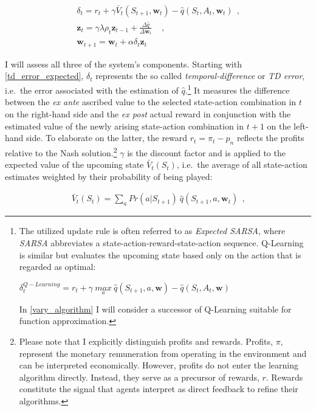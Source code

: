 \begin{gather}
\delta_t = r_t + \gamma \bar{V}_t(S_{t+1}, \boldsymbol{w}_t) - \hat{q}(S_t, A_t, \boldsymbol{w}_t) ~~ \text{,} \label{td_error_expected} \\
\boldsymbol{z}_{t} = 
\gamma \lambda \rho_t \boldsymbol{z}_{t-1} + \frac{\Delta \hat{q}}{\Delta \boldsymbol{w}_t} ~~~~~ \text{,} \label{eligibility_trace_update} \\
\boldsymbol{w}_{t+1} = \boldsymbol{w}_t + \alpha \delta_t	\boldsymbol{z}_t \label{update_rule}
\end{gather}

I will assess all three of the system's components. Starting with \autoref{td_error_expected}, $\delta_t$ represents the so called \emph{temporal-difference} or \emph{TD error}, i.e.\ the error associated with the estimation of $\hat{q}$.\footnote{The utilized update rule is often referred to as \emph{Expected SARSA}, where \emph{SARSA} abbreviates a state-action-reward-state-action sequence. Q-Learning is similar but evaluates the upcoming state based only on the action that is regarded as optimal:
	\begin{center}
		$\delta_t^{Q-Learning} = r_t + \gamma ~ \underset{a}{max} ~ \hat{q}(S_{t+1}, a, \boldsymbol{w}) - \hat{q}(S_t, A_t, \boldsymbol{w})$
	\end{center}
	In \autoref{vary_algorithm} I will consider a successor of Q-Learning suitable for function approximation.} It measures the difference between the \emph{ex ante} ascribed value to the selected state-action combination in $t$ on the right-hand side and the \emph{ex post} actual reward in conjunction with the estimated value of the newly arising state-action combination in $t+1$ on the left-hand side. To elaborate on the latter, the reward $r_t = \pi_t - p_n$ reflects the profits relative to the Nash solution.\footnote{Please note that I explicitly distinguish profits and rewards. Profits, $\pi$, represent the monetary remuneration from operating in the environment and can be interpreted economically. However, profits do not enter the learning algorithm directly. Instead, they serve as a precursor of rewards, $r$. Rewards constitute the signal that agents interpret as direct feedback to refine their algorithms.} $\gamma$ is the discount factor and is applied to the expected value of the upcoming state $\bar{V}_t(S_t)$, i.e.\ the average of all state-action estimates weighted by their probability of being played:

\begin{gather}\label{expected_state_value}
\bar{V}_t(S_t) = \sum_{a} Pr(a|S_{t+1}) ~ \hat{q}(S_{t+1}, a, \boldsymbol{w}_t) ~~   \text{,}
\end{gather}

